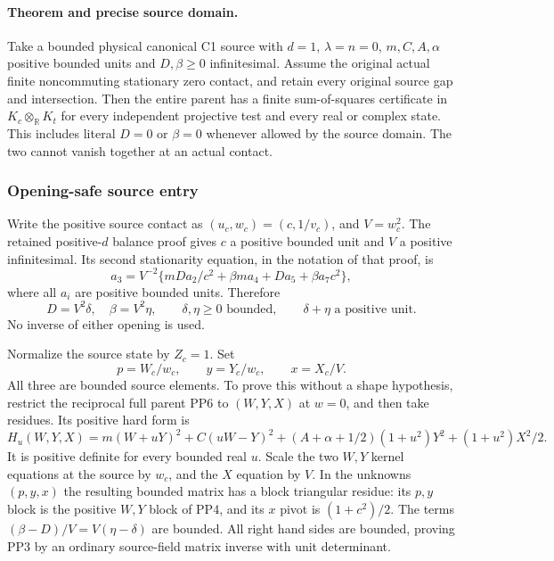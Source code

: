 \label{p2cdf6197677b:sec:new-c1-projective-pitchfork}

\paragraph{Theorem and precise source domain.}
Take a bounded physical canonical C1 source with $d=1$,
$\lambda=n=0$, $m,C,A,\alpha$ positive bounded units and
$D,\beta\geq0$ infinitesimal. Assume the original actual finite
noncommuting stationary zero contact, and retain every original
source gap and intersection. Then the entire parent has a finite
sum-of-squares certificate in $K_c\otimes_{\mathbb R}K_t$ for
every independent projective test and every real or complex state.
This includes literal $D=0$ or $\beta=0$ whenever allowed by the
source domain. The two cannot vanish together at an actual contact.

\subsubsection*{Opening-safe source entry}

Write the positive source contact as $(u_c,w_c)=(c,1/v_c)$,
and $V=w_c^2$. The retained positive-$d$ balance proof gives
$c$ a positive bounded unit and $V$ a positive infinitesimal.
Its second stationarity equation, in the notation of that proof, is
\[
 a_3=V^{-2}\{mDa_2/c^2+\beta ma_4+Da_5+\beta a_7c^2\},
 \tag{PP1}
\]
where all $a_i$ are positive bounded units. Therefore
\[
 D=V^2\delta,\quad\beta=V^2\eta,\qquad
 \delta,\eta\geq0\text{ bounded},\qquad
 \delta+\eta\text{ a positive unit}.
 \tag{PP2}
\]
No inverse of either opening is used.

Normalize the source state by $Z_c=1$. Set
\[
 p=W_c/w_c,\qquad y=Y_c/w_c,\qquad x=X_c/V.
 \tag{PP3}
\]
All three are bounded source elements. To prove this without a
shape hypothesis, restrict the reciprocal full parent PP6 to
$(W,Y,X)$ at $w=0$, and then take residues. Its positive hard form is
\[
 H_u(W,Y,X)=m(W+uY)^2+C(uW-Y)^2
       +(A+\alpha+1/2)(1+u^2)Y^2+(1+u^2)X^2/2.
 \tag{PP4}
\]
It is positive definite for every bounded real $u$. Scale the two
$W,Y$ kernel equations at the source by $w_c$, and the $X$
equation by $V$. In the unknowns $(p,y,x)$ the resulting bounded
matrix has a block triangular residue: its $p,y$ block is the
positive $W,Y$ block of PP4, and its $x$ pivot is $(1+c^2)/2$.
The terms $(\beta-D)/V=V(\eta-\delta)$ are bounded. All right
hand sides are bounded, proving PP3 by an ordinary source-field
matrix inverse with unit determinant.

